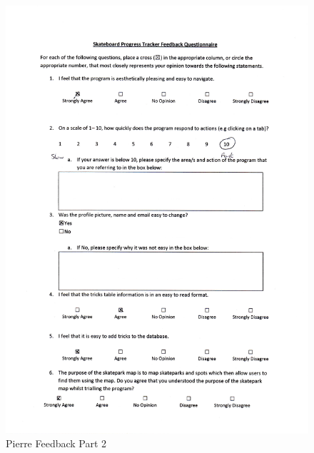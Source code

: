 \begin{itemize}
\begin{figure}[H]
    \includegraphics[width=\textwidth]{./Evaluation/images/PierreFeedback1.pdf}
    \caption{Pierre Feedback Part 2} \label{fig:PierreFeedback2}
\end{figure}


\end{itemize}
